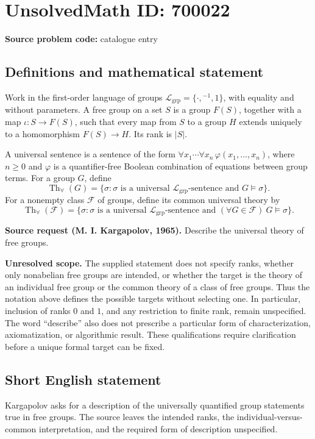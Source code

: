 \documentclass[11pt]{article}
\begin{document}
\section*{UnsolvedMath ID: 700022}
\textbf{Source problem code:} catalogue entry
\subsection{Definitions and mathematical statement}
Work in the first-order language of groups \(\mathcal L_{\mathrm{grp}}=\{\cdot,{}^{-1},1\}\), with equality and without parameters. A free group on a set \(S\) is a group \(F(S)\), together with a map \(\iota:S\to F(S)\), such that every map from \(S\) to a group \(H\) extends uniquely to a homomorphism \(F(S)\to H\). Its rank is \(|S|\).

A universal sentence is a sentence of the form \(\forall x_1\cdots\forall x_n\,\varphi(x_1,\ldots,x_n)\), where \(n\geq 0\) and \(\varphi\) is a quantifier-free Boolean combination of equations between group terms. For a group \(G\), define
\[
\operatorname{Th}_{\forall}(G)=\{\sigma:\sigma\text{ is a universal }\mathcal L_{\mathrm{grp}}\text{-sentence and }G\models\sigma\}.
\]
For a nonempty class \(\mathcal F\) of groups, define its common universal theory by
\[
\operatorname{Th}_{\forall}(\mathcal F)=\{\sigma:\sigma\text{ is a universal }\mathcal L_{\mathrm{grp}}\text{-sentence and }(\forall G\in\mathcal F)\ G\models\sigma\}.
\]

\textbf{Source request (M. I. Kargapolov, 1965).} Describe the universal theory of free groups.

\textbf{Unresolved scope.} The supplied statement does not specify ranks, whether only nonabelian free groups are intended, or whether the target is the theory of an individual free group or the common theory of a class of free groups. Thus the notation above defines the possible targets without selecting one. In particular, inclusion of ranks \(0\) and \(1\), and any restriction to finite rank, remain unspecified. The word ``describe'' also does not prescribe a particular form of characterization, axiomatization, or algorithmic result. These qualifications require clarification before a unique formal target can be fixed.
\subsection{Short English statement}
Kargapolov asks for a description of the universally quantified group statements true in free groups. The source leaves the intended ranks, the individual-versus-common interpretation, and the required form of description unspecified.
\end{document}
